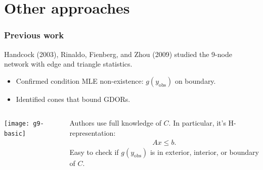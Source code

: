 \documentclass[ 10pt]{beamer}
\newcommand{\yobs}{y_{\text{obs}}}
\begin{document}
\section{Other approaches}
\frame
{
  \frametitle{Previous work}  
Handcock (2003), Rinaldo, Fienberg, and Zhou (2009) studied the 9-node network
with edge and triangle statistics.
\begin{itemize}
	\item Confirmed condition MLE non-existence: $g(\yobs)$ on boundary.  
	\item Identified cones that bound GDORs.%
\end{itemize}
\pause

\begin{columns}[]
\begin{column}[T]{0.4\textwidth}
\texttt{[image: g9-basic]}
\end{column}

\begin{column}[t]{0.6\textwidth}
\vspace{1mm}

Authors use full knowledge of $C$.  In particular, it's H-representation:
\begin{align*}
	Ax \leq b.
\end{align*}
Easy to check if $g(\yobs)$ is in exterior, interior, or boundary of $C$.

\end{column}
\end{columns}


}

\end{document}
